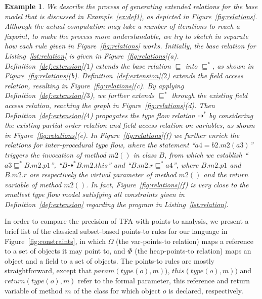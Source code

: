 \documentclass{fac}
\newtheorem{Example}{Example}
\newcommand{\VPT}{\Omega}
\newcommand{\HPT}{\Phi}
\newcommand{\less}{\sqsubseteq}
\newcommand{\tflow}{\dashrightarrow}
\begin{document}
\begin{Example}\label{ex:def2} %
We describe the process of generating extended relations for the base model that is discussed in Example~\ref{ex:def1}, as depicted in Figure~\ref{fig:relations}. Although the actual computation may take a number of iterations to reach a fixpoint, to make the process more understandable, we try to sketch in separate how each rule given in Figure~\ref{fig:relations} works. Initially, the base relation for Listing~\ref{lst:relation} is given in Figure~\ref{fig:relations}(a). Definition~\ref{def:extension}($1$) extends the base relation $\less$ into $\less^*$, as shown in Figure~\ref{fig:relations}(b). Definition~\ref{def:extension}($2$) extends the field access relation, resulting in Figure~\ref{fig:relations}(c). By applying Definition~\ref{def:extension}($3$), we further extends $\less^*$ through the existing field access relation, reaching the graph in Figure~\ref{fig:relations}(d). Then Definition~\ref{def:extension}($4$) propagates the type flow relation $\tflow^*$ by considering the existing partial order relation and field access relation on variables, as shown in Figure~\ref{fig:relations}(e). In Figure~\ref{fig:relations}(f) we further enrich the relations for inter-procedural type flow, where the statement ``$a4=b2.m2(a3)$'' triggers the invocation of method $m2()$ in class $B$, from which we establish ``$a3 \less^* B.m2.p1$'', ``$B \tflow^* B.m2.this$'' and ``$B.m2.r \less^* a4$'', where $B.m2.p1$ and $B.m2.r$ are respectively the virtual parameter of method $m2()$ and the return variable of method $m2()$. In fact, Figure~\ref{fig:relations}(f) is very close to the smallest type flow model satisfying all constraints given in Definition~\ref{def:extension} regarding the program in Listing~\ref{lst:relation}.
%
\end{Example}


In order to compare the precision of TFA with points-to analysis, we present a brief list of the classical subset-based points-to rules for our language in Figure~\ref{fig:constraints}, in which $\VPT$ (the var-points-to relation) maps a reference to a set of objects it may point to, and $\HPT$ (the heap-points-to relation) maps an object and a field to a set of objects. The points-to rules are mostly straightforward, except that %
$param(type(o),m))$, $this(type(o),m))$ and $return(type(o),m)$ refer to the formal parameter, \textsf{this} reference and \textsf{return} variable of method $m$ of the class for which object $o$ is declared, respectively.
\end{document}
